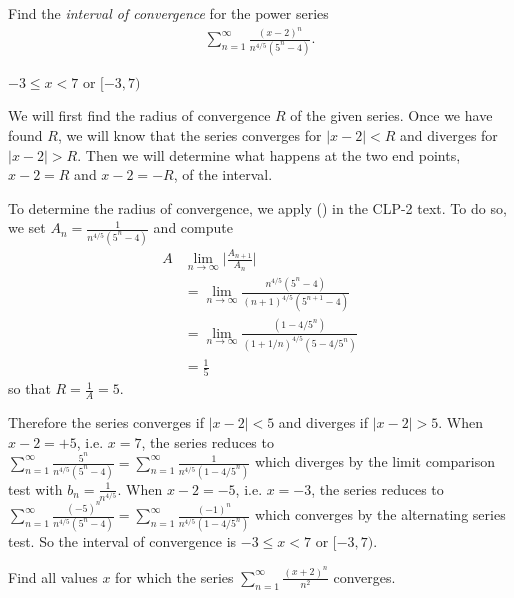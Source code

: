 \begin{Mquestion}[2015A]
 Find the {\em interval of convergence} for the power series
\begin{align*}
\sum_{n=1}^\infty \frac{(x-2)^n}{n^{4/5}(5^n-4)}.
\end{align*}
\end{Mquestion}


\begin{answer}
 $-3\le x< 7$ or $[-3,7)$
\end{answer}

\begin{solution}
We will first find the radius of convergence $R$ of the given series. Once we have found $R$, we will know 
that the series converges for $|x-2|<R$ and diverges for $|x-2|>R$. Then we will determine what 
happens at the two end points, $x-2=R$ and $x-2=-R$, of the interval.

To determine the radius of convergence, we apply () in the CLP-2 text. To do so, 
we set $A_n= \frac{1}{n^{4/5}(5^n-4)}$ and compute
\begin{align*}
A & \lim_{n\to\infty} \bigg| \frac{A_{n+1}}{A_n}\bigg| \\
&=\lim_{n\rightarrow\infty}\frac{n^{4/5}(5^n-4)}{(n+1)^{4/5}(5^{n+1}-4)} \\
&=\lim_{n\rightarrow\infty}\frac{(1-4/5^n)}{(1+1/n)^{4/5}(5-4/5^n)} \\
&=\frac{1}{5}
\end{align*}
so that $R=\frac{1}{A}=5$.

Therefore the series converges if $|x-2|<5$ and diverges if $|x-2|>5$.
When $x-2=+5$, i.e. $x=7$, the series reduces to
$\sum\limits_{n=1}^\infty \frac{5^n}{n^{4/5}(5^n-4)}
 =\sum\limits_{n=1}^\infty \frac{1}{n^{4/5}(1-4/5^n)}$
which diverges by the limit comparison test with $b_n=\frac{1}{n^{4/5}}$.
When $x-2=-5$, i.e. $x=-3$, the series reduces to
$\sum\limits_{n=1}^\infty \frac{(-5)^n}{n^{4/5}(5^n-4)}
 =\sum\limits_{n=1}^\infty \frac{(-1)^n}{n^{4/5}(1-4/5^n)}$
which converges by the alternating series test. So the interval
of convergence is $-3\le x< 7$ or $[-3,7)$.

\end{solution}

\begin{question}[2016Q6]
Find all values $x$ for which the series
$\displaystyle\sum_{n=1}^\infty\frac{(x+2)^n}{n^2}$ converges.
\end{question}

